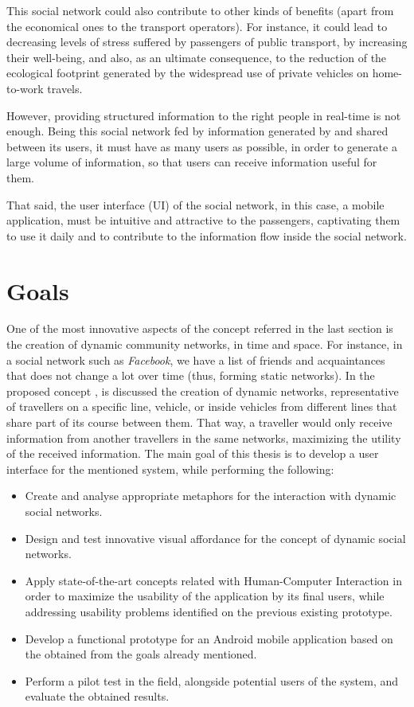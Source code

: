 This social network could also contribute to other kinds of benefits (apart from the economical ones to the transport operators). For instance, it could lead to decreasing levels of stress suffered by passengers of public transport, by increasing their well-being, and also, as an ultimate consequence, to the reduction of the ecological footprint generated by the widespread use of private vehicles on home-to-work travels.

However, providing structured information to the right people in real-time is not enough. Being this social network fed by information generated by and shared between its users, it must have as many users as possible, in order to generate a large volume of information, so that users can receive information useful for them.

That said, the user interface (UI) of the social network, in this case, a mobile application, must be intuitive and attractive to the passengers, captivating them to use it daily and to contribute to the information flow inside the social network. 

\section{Goals} \label{sec:goals}

One of the most innovative aspects of the concept referred in the last section is the creation of dynamic community networks, in time and space. For instance, in a social network such as \emph{Facebook}, we have a list of friends and acquaintances that does not change a lot over time (thus, forming static networks). In the proposed concept \cite{kn:NGeCP11}, is discussed the creation of dynamic networks, representative of travellers on a specific line, vehicle, or inside vehicles from different lines that share part of its course between them. That way, a traveller would only receive information from another travellers in the same networks, maximizing the utility of the received information.
The main goal of this thesis is to develop a user interface for the mentioned system, while performing the following:

\begin{itemize}
\item Create and analyse appropriate metaphors for the interaction with dynamic social networks.
\item Design and test innovative visual affordance for the concept of dynamic social networks.
\item Apply state-of-the-art concepts related with Human-Computer Interaction in order to maximize the usability of the application by its final users, while addressing usability problems identified on the previous existing prototype.
\item Develop a functional prototype for an Android mobile application based on the obtained from the goals already mentioned.
\item Perform a pilot test in the field, alongside potential users of the system, and evaluate the obtained results.
\end{itemize}

